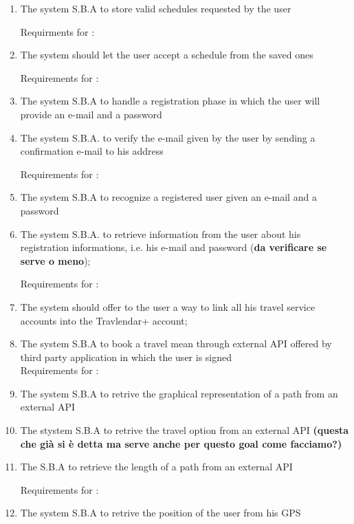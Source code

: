 \begin{enumerate}
\item The system S.B.A to store valid schedules requested by the user


Requirments for :

\item The system should let the user accept a schedule from the saved ones 

Requirements for :

\item The system S.B.A to handle a registration phase in which the user will provide an e-mail and a password

\item The system S.B.A. to verify the e-mail given by the user by sending a confirmation e-mail to his address


Requirements for :
\item The system S.B.A to recognize a registered user given an e-mail and a password \label{req:R9}

\item The system S.B.A. to retrieve information from the user about his registration informations, i.e. his e-mail and password (\textbf{da verificare se serve o meno}); \label{req:R10}

Requirements for : 

\item The system should offer to the user a way to link all his travel service accounts into the Travlendar+ account;

\item The system S.B.A to book a travel mean through external API offered by third party application in which the user is signed
\\

Requirements for :

\item The system S.B.A to retrive the graphical representation of a path from an external API 

\item The stystem S.B.A to retrive the travel option from an external API \textbf{(questa che già si è detta ma serve anche per questo goal come facciamo?)}

\item The S.B.A to retrieve the length of a path from an external API  


Requirements for :

\item The system S.B.A to retrive the position of the user from his GPS


\end{enumerate}
